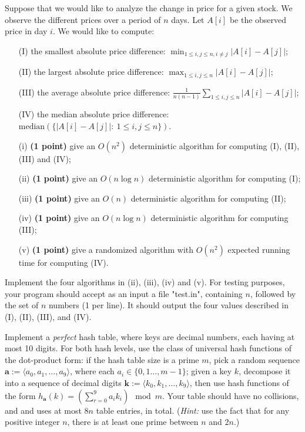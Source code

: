 \documentclass{article}
\begin{document}
\medskip

Suppose that we would like to analyze the change in price for a given
stock. We observe the different prices over a period of $n$ days. Let
$A[i]$ be the observed price in day $i$. We would like to compute: 
\begin{enumerate}
\item[(I)]  the smallest absolute price difference: $\min_{1\le i,j\le n,i\ne j}|A[i]-A[j]|$; 
\item[(II)] the largest absolute price difference: $\max_{1\le i,j\le n}|A[i]-A[j]|$; 
\item[(III)]  the average absolute price difference: $\frac{1}{n(n-1)}\sum_{1\le i,j\le n}|A[i]-A[j]|$; 
\item[(IV)]  the median absolute price difference: $\text{median}(\{|A[i]-A[j]|:~1\le i,j\le n\})$. 
\end{enumerate}
\begin{enumerate}
\item[(i)] \textbf{(1 point)} give an $O(n^2)$ deterministic algorithm for computing (I), (II), (III) and (IV);  
\item[(ii)] \textbf{(1 point)} give an $O(n\log n)$ deterministic algorithm for computing (I); 
\item[(iii)] \textbf{(1 point)} give an $O(n)$ deterministic algorithm for computing (II); 
\item[(iv)] \textbf{(1 point)} give an $O(n\log n)$ deterministic algorithm for computing (III); 
\item[(v)] \textbf{(1 point)}  give a randomized algorithm with $O(n^2)$ expected running time for computing (IV).
\end{enumerate}
Implement the four algorithms in (ii), (iii), (iv) and (v). For
testing purposes, your program  should accept as an input a file
"test.in", containing $n$, followed by the set of $n$ numbers (1 per
line). It should output the four values described in (I), (II), (III),
and (IV).  
\medskip 

Implement a {\it perfect} hash table, where keys are decimal numbers, each having at most 10 digits. For both hash levels, use the class of universal hash functions of the dot-product form: if the hash table size is a prime $m$, pick a random sequence $\mathbf{a}:=\langle a_0,a_1,\ldots,a_9\rangle$, where each $a_i\in\{0,1\ldots,m-1\}$; given a key $k$, decompose it into a sequence of decimal digits $\mathbf k:=\langle k_0,k_1,\ldots,k_9\rangle$, then use hash functions of the form $ h_{\mathbf{a}}(k)=(\sum_{r=0}^9a_ik_i)\mod m$.  
Your table should have  no collisions, and and uses at most $8n$ table entries, in total. ({\it Hint:} use the fact that for any positive integer $n$, there is at least one prime between $n$ and $2n$.)
\end{document}

